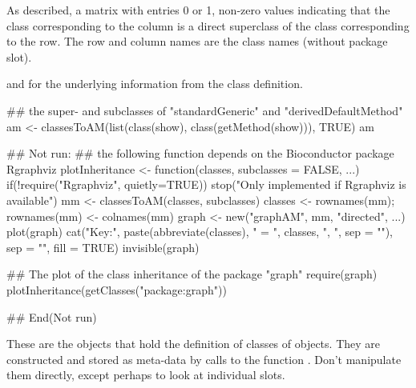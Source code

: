 %
\begin{Value}
As described, a matrix with entries 0 or 1, non-zero values
indicating that the class corresponding to the column is a direct
superclass of the class corresponding to the row.  The row and
column names are the class names (without package slot).
\end{Value}
%
\begin{SeeAlso}\relax
{} and  for the underlying information from the class
definition.
\end{SeeAlso}
%
\begin{Examples}
\begin{ExampleCode}

## the super- and subclasses of "standardGeneric" and "derivedDefaultMethod"
am <- classesToAM(list(class(show), class(getMethod(show))), TRUE)
am

## Not run: 
## the following function depends on the Bioconductor package Rgraphviz
plotInheritance <- function(classes, subclasses = FALSE, ...) {
    if(!require("Rgraphviz", quietly=TRUE))
      stop("Only implemented if Rgraphviz is available")
    mm <- classesToAM(classes, subclasses)
    classes <- rownames(mm); rownames(mm) <- colnames(mm)
    graph <-  new("graphAM", mm, "directed", ...)
    plot(graph)
    cat("Key:\n", paste(abbreviate(classes), " = ", classes, ", ",
        sep = ""),  sep = "", fill = TRUE)
    invisible(graph)
}

## The plot of the class inheritance of the package "graph"
require(graph)
plotInheritance(getClasses("package:graph"))


## End(Not run)
\end{ExampleCode}
\end{Examples}
%
\begin{Description}\relax
  These are the objects that hold the definition of
classes of objects.  They are constructed and stored as meta-data by
calls to the function .  Don't manipulate them
directly, except perhaps to look at individual slots. 
\end{Description}
%
